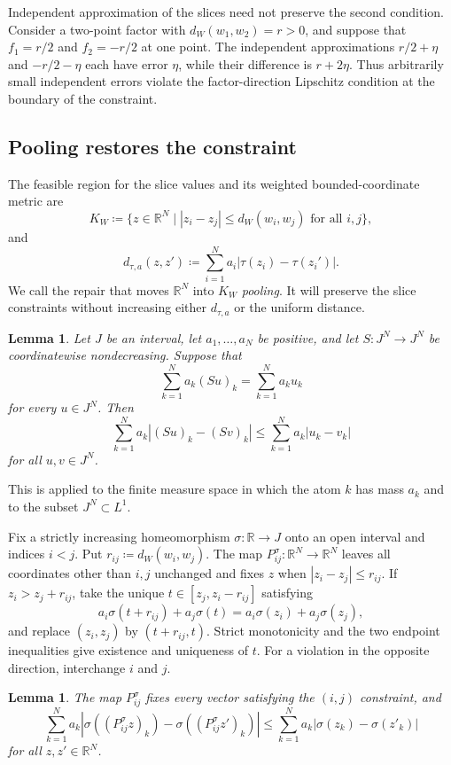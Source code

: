 \documentclass[11pt]{amsart}
\theoremstyle{plain}
\newtheorem{lemma}[theorem]{Lemma}
\theoremstyle{definition}
\theoremstyle{remark}
\newcommand{\R}{\mathbb R}
\begin{document}
Independent approximation of the slices need not preserve the second condition. Consider a two-point factor with $d_W(w_1,w_2)=r>0$, and suppose that $f_1=r/2$ and $f_2=-r/2$ at one point. The independent approximations $r/2+\eta$ and $-r/2-\eta$ each have error $\eta$, while their difference is $r+2\eta$. Thus arbitrarily small independent errors violate the factor-direction Lipschitz condition at the boundary of the constraint.

\subsection{Pooling restores the constraint}
\label{subsec:pooling}

The feasible region for the slice values and its weighted bounded-coordinate metric are
\[
K_W\coloneqq\{z\in\R^N\mid |z_i-z_j|\leq d_W(w_i,w_j)\text{ for all }i,j\},
\]
and
\[
d_{\tau,a}(z,z')\coloneqq\sum_{i=1}^Na_i|\tau(z_i)-\tau(z_i')|.
\]
We call the repair that moves $\R^N$ into $K_W$ \emph{pooling}. It will preserve the slice constraints without increasing either $d_{\tau,a}$ or the uniform distance.

\begin{lemma}
\label{lem:order-mass-contraction}
Let $J$ be an interval, let $a_1,\ldots,a_N$ be positive, and let $S\colon J^N\to J^N$ be coordinatewise nondecreasing. Suppose that
\[
\sum_{k=1}^Na_k(Su)_k=\sum_{k=1}^Na_ku_k
\]
for every $u\in J^N$. Then
\[
\sum_{k=1}^Na_k|(Su)_k-(Sv)_k|\leq\sum_{k=1}^Na_k|u_k-v_k|
\]
for all $u,v\in J^N$.
\end{lemma}

This is \cite[Proposition~1, p.~385]{crandall-tartar1980nonexpansiveorder} applied to the finite measure space in which the atom $k$ has mass $a_k$ and to the subset $J^N\subset L^1$.

Fix a strictly increasing homeomorphism $\sigma\colon\R\to J$ onto an open interval and indices $i<j$. Put $r_{ij}\coloneqq d_W(w_i,w_j)$. The map $P_{ij}^\sigma\colon\R^N\to\R^N$ leaves all coordinates other than $i,j$ unchanged and fixes $z$ when $|z_i-z_j|\leq r_{ij}$. If $z_i>z_j+r_{ij}$, take the unique $t\in[z_j,z_i-r_{ij}]$ satisfying
\[
a_i\sigma(t+r_{ij})+a_j\sigma(t)=a_i\sigma(z_i)+a_j\sigma(z_j),
\]
and replace $(z_i,z_j)$ by $(t+r_{ij},t)$. Strict monotonicity and the two endpoint inequalities give existence and uniqueness of $t$. For a violation in the opposite direction, interchange $i$ and $j$.

\begin{lemma}
\label{lem:pairwise-pooling}
The map $P_{ij}^\sigma$ fixes every vector satisfying the $(i,j)$ constraint, and
\[
\sum_{k=1}^Na_k|\sigma((P_{ij}^\sigma z)_k)-\sigma((P_{ij}^\sigma z')_k)|\leq\sum_{k=1}^Na_k|\sigma(z_k)-\sigma(z'_k)|
\]
for all $z,z'\in\R^N$.
\end{lemma}
\end{document}
